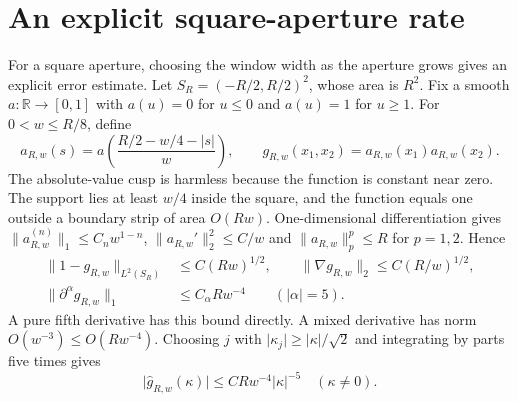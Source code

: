 \documentclass[11pt,a4paper]{article}
\theoremstyle{remark}
\newcommand{\norm}[1]{\lVert #1\rVert}
\newcommand{\abs}[1]{\lvert #1\rvert}
\begin{document}
\section{An explicit square-aperture rate}\label{sec:rate}
For a square aperture, choosing the window width as the aperture grows gives an explicit error estimate. Let $S_R=(-R/2,R/2)^2$, whose area is $R^2$. Fix a smooth $a:\mathbb R\to[0,1]$ with $a(u)=0$ for $u\leq0$ and $a(u)=1$ for $u\geq1$. For $0<w\leq R/8$, define
\[
 a_{R,w}(s)=a\left(\frac{R/2-w/4-\abs s}{w}\right),\qquad
 g_{R,w}(x_1,x_2)=a_{R,w}(x_1)a_{R,w}(x_2).
\]
The absolute-value cusp is harmless because the function is constant near zero. The support lies at least $w/4$ inside the square, and the function equals one outside a boundary strip of area $O(Rw)$. One-dimensional differentiation gives $\norm{a_{R,w}^{(n)}}_1\leq C_nw^{1-n}$, $\norm{a_{R,w}'}_2^2\leq C/w$ and $\norm{a_{R,w}}_p^p\leq R$ for $p=1,2$. Hence
\begin{equation}\label{eq:cutoff-estimates}
 \begin{aligned}
 \norm{1-g_{R,w}}_{L^2(S_R)}&\leq C(Rw)^{1/2},\qquad
 \norm{\nabla g_{R,w}}_2\leq C(R/w)^{1/2},\\
 \norm{\partial^\alpha g_{R,w}}_1&\leq C_\alpha Rw^{-4}\qquad(\abs\alpha=5).
 \end{aligned}
\end{equation}
A pure fifth derivative has this bound directly. A mixed derivative has norm $O(w^{-3})\leq O(Rw^{-4})$. Choosing $j$ with $\abs{\kappa_j}\geq\abs\kappa/\sqrt2$ and integrating by parts five times gives
\begin{equation}\label{eq:cutoff-Fourier}
 \abs{\widehat g_{R,w}(\kappa)}\leq CRw^{-4}\abs\kappa^{-5}\quad(\kappa\ne0).
\end{equation}
\end{document}
